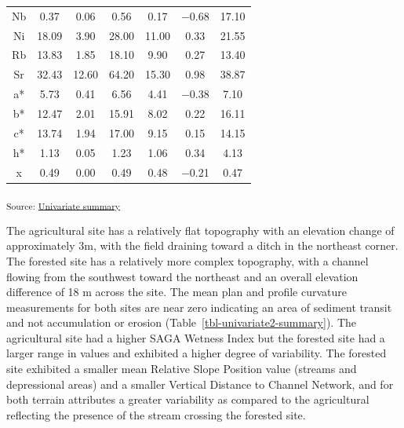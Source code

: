 \documentclass[
  number]{elsarticle}
\begin{document}
\begin{longtable}[]{@{}ccccccc@{}}
Nb & 0.37 & 0.06 & 0.56 & 0.17 & −0.68 & 17.10 \\
Ni & 18.09 & 3.90 & 28.00 & 11.00 & 0.33 & 21.55 \\
Rb & 13.83 & 1.85 & 18.10 & 9.90 & 0.27 & 13.40 \\
Sr & 32.43 & 12.60 & 64.20 & 15.30 & 0.98 & 38.87 \\
a* & 5.73 & 0.41 & 6.56 & 4.41 & −0.38 & 7.10 \\
b* & 12.47 & 2.01 & 15.91 & 8.02 & 0.22 & 16.11 \\
c* & 13.74 & 1.94 & 17.00 & 9.15 & 0.15 & 14.15 \\
h* & 1.13 & 0.05 & 1.23 & 1.06 & 0.34 & 4.13 \\
x & 0.49 & 0.00 & 0.49 & 0.48 & −0.21 & 0.47 \\

\end{longtable}

\textsubscript{Source:
\href{https://alex-koiter.github.io/spatial-variability-soil-manuscript/notebooks/univariate_summary.qmd.html\#cell-tbl-univariate-summary}{Univariate
summary}}

The agricultural site has a relatively flat topography with an elevation
change of approximately 3m, with the field draining toward a ditch in
the northeast corner. The forested site has a relatively more complex
topography, with a channel flowing from the southwest toward the
northeast and an overall elevation difference of 18 m across the site.
The mean plan and profile curvature measurements for both sites are near
zero indicating an area of sediment transit and not accumulation or
erosion (Table~\ref{tbl-univariate2-summary}). The agricultural site had
a higher SAGA Wetness Index but the forested site had a larger range in
values and exhibited a higher degree of variability. The forested site
exhibited a smaller mean Relative Slope Position value (streams and
depressional areas) and a smaller Vertical Distance to Channel Network,
and for both terrain attributes a greater variability as compared to the
agricultural reflecting the presence of the stream crossing the forested
site.
\end{document}
